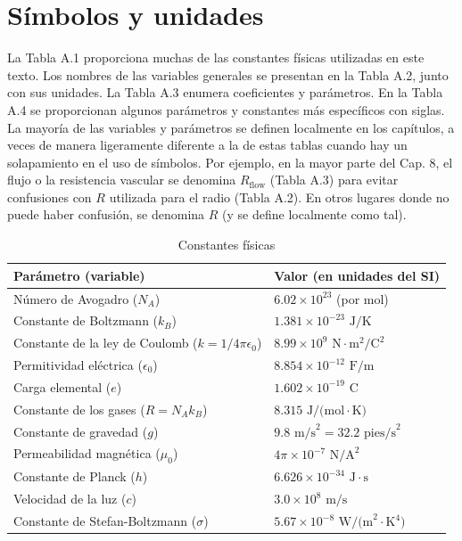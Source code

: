 \documentclass[12pt,a4paper]{book}
\begin{document}
\appendix


\chapter{Símbolos y unidades}\label{ch:appendixA}

\label{ch:appendix_a}

La Tabla A.1 proporciona muchas de las constantes físicas utilizadas en este texto. Los nombres de las variables generales se presentan en la Tabla A.2, junto con sus unidades. La Tabla A.3 enumera coeficientes y parámetros. En la Tabla A.4 se proporcionan algunos parámetros y constantes más específicos con siglas. La mayoría de las variables y parámetros se definen localmente en los capítulos, a veces de manera ligeramente diferente a la de estas tablas cuando hay un solapamiento en el uso de símbolos. Por ejemplo, en la mayor parte del Cap. 8, el flujo o la resistencia vascular se denomina $R_{\text{flow}}$ (Tabla A.3) para evitar confusiones con $R$ utilizada para el radio (Tabla A.2). En otros lugares donde no puede haber confusión, se denomina $R$ (y se define localmente como tal).

\begin{table}[htbp]
  \centering
  \caption{Constantes físicas}
  \label{tab:A.1}
  \begin{tabularx}{\textwidth}{>{\hsize=1.1\hsize}X >{\hsize=0.9\hsize}X}
    \toprule
    \textbf{Parámetro (variable)} & \textbf{Valor (en unidades del SI)} \\
    \midrule
    Número de Avogadro ($N_A$) & $6.02 \times 10^{23}$ (por mol) \\
    Constante de Boltzmann ($k_B$) & $1.381 \times 10^{-23}\text{ J/K}$ \\
    Constante de la ley de Coulomb ($k = 1/4\pi\epsilon_0$) & $8.99 \times 10^9\text{ N}\cdot\text{m}^2/\text{C}^2$ \\
    Permitividad eléctrica ($\epsilon_0$) & $8.854 \times 10^{-12}\text{ F/m}$ \\
    Carga elemental ($e$) & $1.602 \times 10^{-19}\text{ C}$ \\
    Constante de los gases ($R = N_A k_B$) & $8.315\text{ J/(mol}\cdot\text{K)}$ \\
    Constante de gravedad ($g$) & $9.8\text{ m/s}^2 = 32.2\text{ pies/s}^2$ \\
    Permeabilidad magnética ($\mu_0$) & $4\pi \times 10^{-7}\text{ N/A}^2$ \\
    Constante de Planck ($h$) & $6.626 \times 10^{-34}\text{ J}\cdot\text{s}$ \\
    Velocidad de la luz ($c$) & $3.0 \times 10^8\text{ m/s}$ \\
    Constante de Stefan-Boltzmann ($\sigma$) & $5.67 \times 10^{-8}\text{ W/(m}^2\cdot\text{K}^4)$ \\
    \bottomrule
  \end{tabularx}
\end{table}
\end{document}
